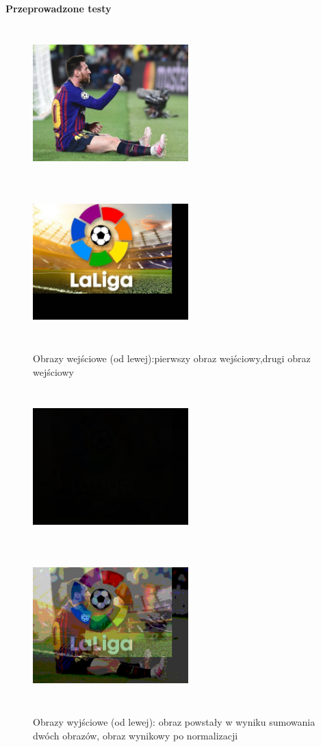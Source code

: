 \documentclass[magisterska,openany]{pracadypl}
\begin{document}
\newpage
\vspace{0.25cm}\textbf{\Large Przeprowadzone testy}
\vspace{0.5cm}
\begin{figure}[h]
\centering
\includegraphics[width=6cm, height=6cm]{2_4/ResolRGB1.jpg}
\includegraphics[width=6cm, height=6cm]{2_4/ResolRGB2.jpg}
\caption{Obrazy wejściowe (od lewej):pierwszy obraz wejściowy,drugi obraz wejściowy}
\end{figure}
\begin{figure}[h]
\centering
\includegraphics[width=6cm, height=6cm]{4_2/add_twoRGB1.jpg}
\includegraphics[width=6cm, height=6cm]{4_2/nadd_twoRGB1.jpg}
\caption{Obrazy wyjściowe (od lewej): obraz powstały w wyniku sumowania dwóch obrazów, obraz wynikowy po normalizacji}
\end{figure}
\end{document}
